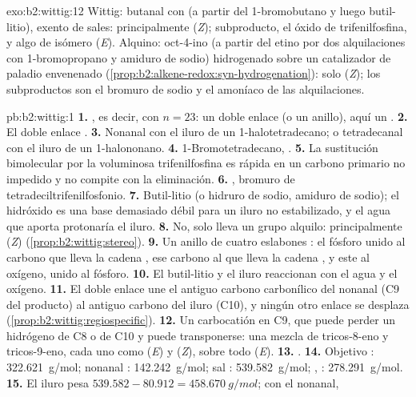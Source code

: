\begin{solution}{exo:b2:wittig:12}
Wittig: butanal con  (a partir del 1-bromobutano y luego butil-litio), exento de sales:
principalmente (\textit{Z}); subproducto, el óxido de trifenilfosfina, y algo de isómero (\textit{E}). Alquino:
oct-4-ino (a partir del etino por dos alquilaciones con 1-bromopropano y amiduro de sodio) hidrogenado sobre un
catalizador de paladio envenenado (\cref{prop:b2:alkene-redox:syn-hydrogenation}): solo (\textit{Z}); los
subproductos son el bromuro de sodio y el amoníaco de las alquilaciones.
\end{solution}

\begin{solution}{pb:b2:wittig:1}
\textbf{1.} , es decir,  con $n = 23$: un doble enlace (o un anillo), aquí un
.
\textbf{2.} El doble enlace .
\textbf{3.} Nonanal  con el iluro de un 1-halotetradecano; o tetradecanal
 con el iluro de un 1-halononano.
\textbf{4.} 1-Bromotetradecano, .
\textbf{5.} La sustitución bimolecular por la voluminosa trifenilfosfina es rápida en un carbono primario no impedido
y no compite con la eliminación.
\textbf{6.} , bromuro de tetradeciltrifenilfosfonio.
\textbf{7.} Butil-litio (o hidruro de sodio, amiduro de sodio); el hidróxido es una base demasiado débil para un
iluro no estabilizado, y el agua que aporta protonaría el iluro.
\textbf{8.} No, solo lleva un grupo alquilo: principalmente (\textit{Z}) (\cref{prop:b2:wittig:stereo}).
\textbf{9.} Un anillo de cuatro eslabones : el fósforo unido al carbono que lleva la cadena
, ese carbono al que lleva la cadena , y este al oxígeno, unido
al fósforo.
\textbf{10.} El butil-litio y el iluro reaccionan con el agua y el oxígeno.
\textbf{11.} El doble enlace une el antiguo carbono carbonílico del nonanal (C9 del producto) al
antiguo carbono del iluro (C10), y ningún otro enlace se desplaza (\cref{prop:b2:wittig:regiospecific}).
\textbf{12.} Un carbocatión en C9, que puede perder un hidrógeno de C8 o de C10 y puede transponerse: una mezcla de
tricos-8-eno y tricos-9-eno, cada uno como (\textit{E}) y (\textit{Z}), sobre todo (\textit{E}).
\textbf{13.} .
\textbf{14.} Objetivo : \qty{322.621}{g/mol}; nonanal : \qty{142.242}{g/mol}; sal
: \qty{539.582}{g/mol}; , : \qty{278.291}{g/mol}.
\textbf{15.} El iluro  pesa $539.582 - 80.912 = \qty{458.670}{g/mol}$; con el nonanal,

\end{solution}

